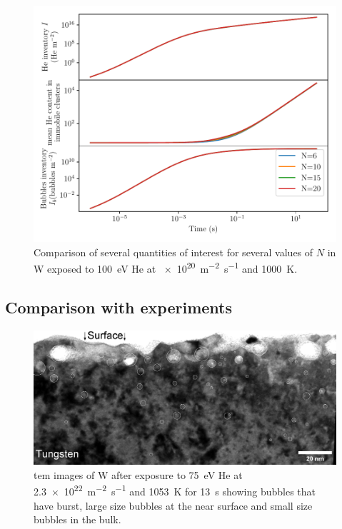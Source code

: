 \begin{figure} [h]
    \centering
    \includegraphics[width=\linewidth]{Figures/Chapter4/varying_N.pdf}
    \caption{Comparison of several quantities of interest for several values of $N$ in W exposed to \SI{100}{eV} He at \SI{e20}{m^{-2}.s^{-1}} and \SI{1000}{K}.}
\end{figure}

\subsection{Comparison with experiments}

\begin{figure} [h]
    \centering
    \includegraphics[width=\linewidth]{Figures/Chapter4/bubbles_tem.jpg}
    \caption{\gls{tem} images of W after exposure to \SI{75}{eV} He at \SI{2.3e22}{m^{-2}.s^{-1}} and \SI{1053}{K} for \SI{13}{s} showing bubbles that have burst, large size bubbles at the near surface and small size bubbles in the bulk.}
\end{figure}

